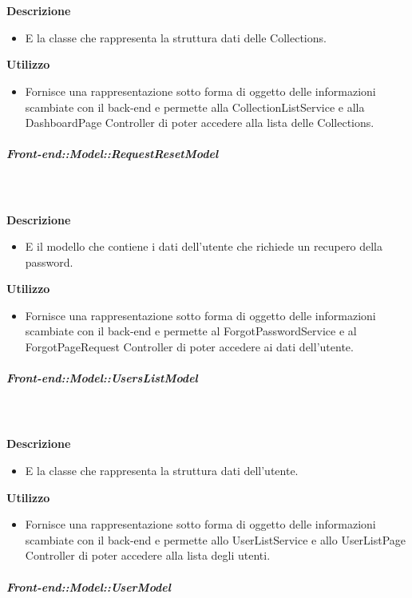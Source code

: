 \begin{itemize}
        \textbf{\\ \\ Descrizione} 
          \begin{itemize}
            \item[] E la classe che rappresenta la struttura dati delle Collections.
          \end{itemize}      
        \textbf{Utilizzo}  
          \begin{itemize}
            \item[] Fornisce una rappresentazione sotto forma di oggetto delle informazioni scambiate con il back-end e permette alla CollectionListService e alla DashboardPage Controller di poter accedere alla lista delle Collections.
          \end{itemize}
      \subparagraph{Front-end::Model::RequestResetModel}
        
        \textbf{\\ \\ Descrizione} 
          \begin{itemize}
            \item[] E il modello che contiene i dati dell'utente che richiede un recupero della password.
          \end{itemize}      
        \textbf{Utilizzo}  
          \begin{itemize}
            \item[] Fornisce una rappresentazione sotto forma di oggetto delle informazioni scambiate con il back-end e permette al ForgotPasswordService e al ForgotPageRequest Controller di poter accedere ai dati dell'utente.
          \end{itemize}
      \subparagraph{Front-end::Model::UsersListModel}
        
        \textbf{\\ \\ Descrizione} 
          \begin{itemize}
            \item[] E la classe che rappresenta la struttura dati dell'utente.
          \end{itemize}      
        \textbf{Utilizzo}  
          \begin{itemize}
            \item[] Fornisce una rappresentazione sotto forma di oggetto delle informazioni scambiate con il back-end e permette allo UserListService e allo UserListPage Controller di poter accedere alla lista degli utenti.
          \end{itemize}
      \subparagraph{Front-end::Model::UserModel}
        

\end{itemize}
